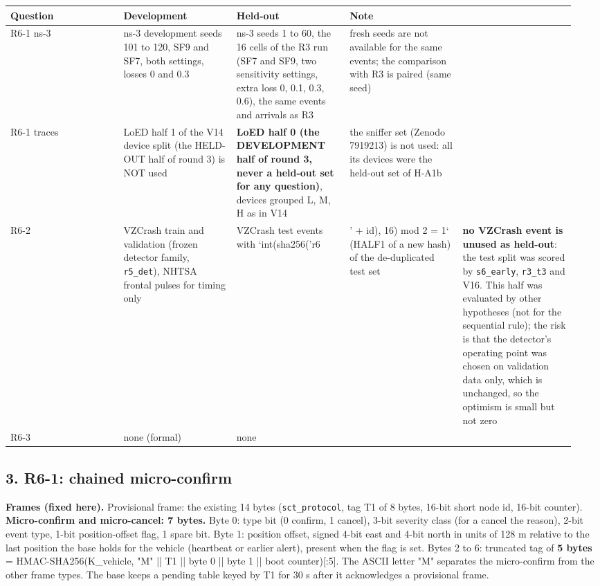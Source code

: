 {\scriptsize\raggedright
\begin{longtable}{p{0.190\linewidth}p{0.190\linewidth}p{0.190\linewidth}p{0.190\linewidth}p{0.190\linewidth}}
\toprule
Question & Development & Held-out & Note &  \\
\midrule
\endhead
R6-1 ns-3 & ns-3 development seeds 101 to 120, SF9 and SF7, both settings, losses 0 and 0.3 & ns-3 seeds 1 to 60, the 16 cells of the R3 run (SF7 and SF9, two sensitivity settings, extra loss 0, 0.1, 0.3, 0.6), the same events and arrivals as R3 & fresh seeds are not available for the same events; the comparison with R3 is paired (same seed) &  \\
R6-1 traces & LoED half 1 of the V14 device split (the HELD-OUT half of round 3) is NOT used & \textbf{LoED half 0 (the DEVELOPMENT half of round 3, never a held-out set for any question)}, devices grouped L, M, H as in V14 & the sniffer set (Zenodo 7919213) is not used: all its devices were the held-out set of H-A1b &  \\
R6-2 & VZCrash train and validation (frozen detector family, \texttt{r5\_det}), NHTSA frontal pulses for timing only & VZCrash test events with `int(sha256('r6 & ' + id), 16) mod 2 = 1` (HALF1 of a new hash) of the de-duplicated test set & \textbf{no VZCrash event is unused as held-out}: the test split was scored by \texttt{s6\_early}, \texttt{r3\_t3} and V16. This half was evaluated by other hypotheses (not for the sequential rule); the risk is that the detector's operating point was chosen on validation data only, which is unchanged, so the optimism is small but not zero \\
R6-3 & none (formal) & none &  &  \\
\bottomrule
\end{longtable}}

\subsection*{3. R6-1: chained micro-confirm}

\textbf{Frames (fixed here).} Provisional frame: the existing 14 bytes (\texttt{sct\_protocol}, tag T1 of 8 bytes, 16-bit short node id, 16-bit counter). \textbf{Micro-confirm and micro-cancel: 7 bytes.} Byte 0: type bit (0 confirm, 1 cancel), 3-bit severity class (for a cancel the reason), 2-bit event type, 1-bit position-offset flag, 1 spare bit. Byte 1: position offset, signed 4-bit east and 4-bit north in units of 128 m relative to the last position the base holds for the vehicle (heartbeat or earlier alert), present when the flag is set. Bytes 2 to 6: truncated tag of \textbf{5 bytes} = HMAC-SHA256(K\_vehicle, "M" || T1 || byte 0 || byte 1 || boot counter)[:5]. The ASCII letter "M" separates the micro-confirm from the other frame types. The base keeps a pending table keyed by T1 for 30 s after it acknowledges a provisional frame.

